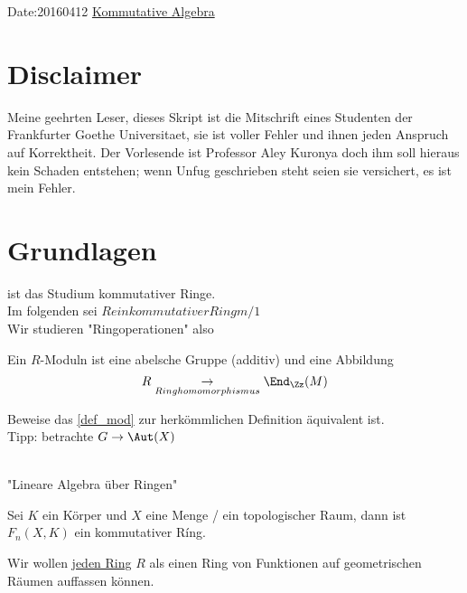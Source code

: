 Date:20160412
\underline{Kommutative Algebra}
\section{Disclaimer}
Meine geehrten Leser,
dieses Skript ist die Mitschrift eines Studenten der Frankfurter Goethe Universitaet, sie ist voller Fehler und ihnen jeden Anspruch auf Korrektheit.
Der Vorlesende ist Professor Aley Kuronya doch ihm soll hieraus kein Schaden entstehen; wenn Unfug geschrieben steht seien sie versichert, es ist mein Fehler.
\section{Grundlagen}
ist das Studium kommutativer Ringe.\\
Im folgenden sei \( R ein kommutativer Ring m/ 1 \) \\
Wir studieren "Ringoperationen" also  \\
\begin{defn}[Moduln] \label{def_mod}
Ein \(R\)-Moduln ist eine abelsche Gruppe (additiv) und eine Abbildung 
\[R \underset{Ringhomomorphismus}{\to} \End_\Zz(M) \]
\end{defn}
\begin{hausaufgabe}
Beweise das \ref{def_mod} zur herk\"ommlichen Definition \"aquivalent ist. \\
Tipp: betrachte \( G \to \Aut(X) \)
\end{hausaufgabe}
\\
"Lineare Algebra \"uber Ringen" \\
\begin{bsp}
Sei \( K \)  ein K\"orper und \( X \) eine Menge / ein topologischer Raum, dann ist \( F_n (X,K ) \) ein kommutativer Ríng.
\end{bsp}
\begin{Ziel}
Wir wollen \underline{jeden Ring} \( R \) als einen Ring von Funktionen auf geometrischen R\"aumen auffassen k\"onnen. \\
\end{Ziel}
